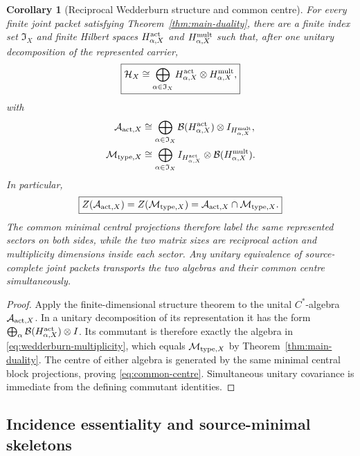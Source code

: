 \documentclass[11pt]{article}
\newtheorem{corollary}[theorem]{Corollary}
\theoremstyle{definition}
\theoremstyle{remark}
\newcommand{\A}{\mathcal A}
\newcommand{\Hh}{\mathcal H}
\newcommand{\M}{\mathcal M}
\begin{document}
\begin{corollary}[Reciprocal Wedderburn structure and common centre]
\label{cor:reciprocal-wedderburn}
For every finite joint packet satisfying Theorem~\ref{thm:main-duality}, there
are a finite index set $\mathfrak I_X$ and finite Hilbert spaces
$H^{\rm act}_{\alpha,X}$ and $H^{\rm mult}_{\alpha,X}$ such that, after one
unitary decomposition of the represented carrier,
\begin{equation}
\boxed{
\Hh_X
\cong
\bigoplus_{\alpha\in\mathfrak I_X}
H^{\rm act}_{\alpha,X}\otimes H^{\rm mult}_{\alpha,X},}
\label{eq:wedderburn-H}
\end{equation}
with
\begin{align}
\A_{{\rm act},X}
&\cong
\bigoplus_{\alpha\in\mathfrak I_X}
\mathcal B(H^{\rm act}_{\alpha,X})\otimes I_{H^{\rm mult}_{\alpha,X}},
\label{eq:wedderburn-action}\\
\M_{{\rm type},X}
&\cong
\bigoplus_{\alpha\in\mathfrak I_X}
I_{H^{\rm act}_{\alpha,X}}\otimes
\mathcal B(H^{\rm mult}_{\alpha,X}).
\label{eq:wedderburn-multiplicity}
\end{align}
In particular,
\begin{equation}
\boxed{
Z(\A_{{\rm act},X})
=
Z(\M_{{\rm type},X})
=
\A_{{\rm act},X}\cap\M_{{\rm type},X}.}
\label{eq:common-centre}
\end{equation}
The common minimal central projections therefore label the same represented
sectors on both sides, while the two matrix sizes are reciprocal action and
multiplicity dimensions inside each sector.  Any unitary equivalence of
source-complete joint packets transports the two algebras and their common
centre simultaneously.
\end{corollary}

\begin{proof}
Apply the finite-dimensional structure theorem to the unital $C^*$-algebra
$\A_{{\rm act},X}$.  In a unitary decomposition of its representation it has
the form
$\bigoplus_\alpha\mathcal B(H^{\rm act}_{\alpha,X})\otimes I$.
Its commutant is therefore exactly the algebra in
\eqref{eq:wedderburn-multiplicity}, which equals $\M_{{\rm type},X}$ by
Theorem~\ref{thm:main-duality}.  The centre of either algebra is generated by
the same minimal central block projections, proving
\eqref{eq:common-centre}.  Simultaneous unitary covariance is immediate from
the defining commutant identities.
\end{proof}


\subsection{Incidence essentiality and source-minimal skeletons}
\label{sec:incidence-skeleton}
\end{document}
